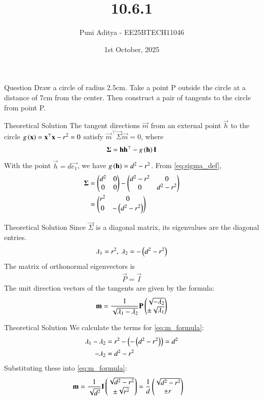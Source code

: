 \documentclass{beamer}
\title{10.6.1}
\date{1st October, 2025}
\author{Puni Aditya - EE25BTECH11046}
\begin{document}
\frame{\titlepage}
\begin{frame}{Question}
Draw a circle of radius 2.5cm. Take a point P outside the circle at a distance of 7cm from the center. Then construct a pair of tangents to the circle from point P.
\end{frame}

\begin{frame}{Theoretical Solution}
The tangent directions $\vec{m}$ from an external point $\vec{h}$ to the circle $g\left(\mathbf{x}\right)=\mathbf{x}^\top\mathbf{x}-r^2=0$ satisfy $\vec{m}^\top\vec{\Sigma}\vec{m} = 0$, where
\begin{align}
    \mathbf{\Sigma} = \mathbf{h}\mathbf{h}^\top - g\left(\mathbf{h}\right)\mathbf{I} \label{eq:sigma_def}
\end{align}
With the point $\vec{h}=d\vec{e_1}$, we have $g\left(\mathbf{h}\right) = d^2-r^2$. From \eqref{eq:sigma_def},
\begin{align}
    \mathbf{\Sigma} &= \begin{pmatrix}d^2 & 0 \\ 0 & 0\end{pmatrix} - \begin{pmatrix}d^2-r^2 & 0 \\ 0 & d^2-r^2\end{pmatrix} \nonumber \\
    &= \begin{pmatrix}r^2 & 0 \\ 0 & -\left(d^2-r^2\right)\end{pmatrix}
\end{align}
\end{frame}

\begin{frame}{Theoretical Solution}
Since $\vec{\Sigma}$ is a diagonal matrix, its eigenvalues are the diagonal entries.
\begin{align}
 \lambda_1 = r^2, \text{ } \lambda_2 = -\left(d^2-r^2\right)
\end{align}
The matrix of orthonormal eigenvectors is 
\begin{align}
	\vec{P}=\vec{I}
\end{align}
The unit direction vectors of the tangents are given by the formula:
\begin{align}
    \mathbf{m} = \frac{1}{\sqrt{\lambda_1-\lambda_2}}\mathbf{P}\begin{pmatrix}\sqrt{-\lambda_2} \\ \pm\sqrt{\lambda_1}\end{pmatrix} \label{eq:m_formula}
\end{align}
\end{frame}

\begin{frame}{Theoretical Solution}
We calculate the terms for \eqref{eq:m_formula}:
\begin{align}
    \lambda_1-\lambda_2 &= r^2 - \left(-\left(d^2-r^2\right)\right) = d^2 \\
    -\lambda_2 &= d^2-r^2
\end{align}
Substituting these into \eqref{eq:m_formula}:
\begin{align}
    \mathbf{m} &= \frac{1}{\sqrt{d^2}}\mathbf{I}\begin{pmatrix}\sqrt{d^2-r^2} \\ \pm\sqrt{r^2}\end{pmatrix} = \frac{1}{d}\begin{pmatrix}\sqrt{d^2-r^2} \\ \pm r\end{pmatrix}
\end{align}
\end{frame}
\end{document}
